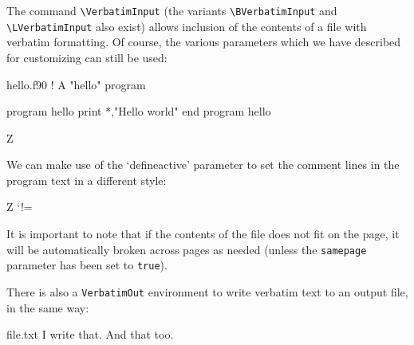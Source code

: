 \documentclass[twoside]{article}
\newcommand\cs[1]{\texttt{\textbackslash#1}}
\begin{document}
  The command \cs{VerbatimInput} (the variants \cs{BVerbatimInput} and
\cs{LVerbatimInput} also exist) allows inclusion of the contents of a file
with verbatim formatting. Of course, the various parameters which we have
described for customizing can still be used:


\typeout{*************************************}
\typeout{*************************************}

\begin{VerbatimOut}{hello.f90}
  ! A "hello" program

  program hello
    print *,"Hello world"
  end program hello
\end{VerbatimOut}

\begin{SideBySideExample}
  Z



\end{SideBySideExample}

  We can make use of the `defineactive' parameter to set the comment lines
  in the program text in a different style:

\begin{SideBySideExample}
  Z
  \def\ExclamationPoint{\char33}
  \catcode`!=\active
  \VerbatimInput%
    [defineactive=%
      \def!{\color{cyan}\itshape
        \ExclamationPoint}]
    {hello.f90}
\end{SideBySideExample}

  It is important to note that if the contents of the file does not fit on
the page, it will be automatically broken across pages as needed (unless the
\texttt{samepage} parameter has been set to \texttt{true}).

  There is also a \verb+VerbatimOut+ environment to write verbatim text to an
output file, in the same way:

\begin{SideBySideExample}
  \begin{VerbatimOut}{file.txt}
    I write that.
    And that too.
  \end{VerbatimOut}

\end{SideBySideExample}
\end{document}
